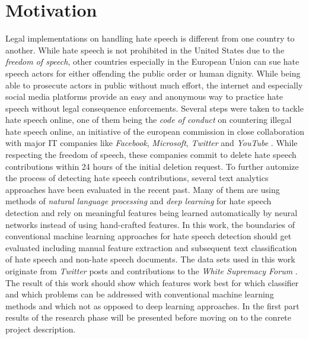 \section{Motivation}

Legal implementations on handling hate speech is different from one country to another. While hate speech is not prohibited in the United States due to the \textit{freedom of speech}, other countries especially in the European Union can sue hate speech actors for either offending the public order or human dignity. While being able to prosecute actors in public without much effort, the internet and especially social media platforms provide an easy and anonymous way to practice hate speech without legal consequence enforcements. Several steps were taken to tackle hate speech online, one of them being the \textit{code of conduct} on countering illegal hate speech online, an initiative of the european commission in close collaboration with major IT companies like \textit{Facebook}, \textit{Microsoft}, \textit{Twitter} and \textit{YouTube} \cite{EuropeanCommission.20200622}. While respecting the freedom of speech, these companies commit to delete hate speech contributions within 24 hours of the initial deletion request. To further automize the process of detecting hate speech contributions, several text analytics approaches have been evaluated in the recent past. Many of them are using methods of \textit{natural language processing} and \textit{deep learning} for hate speech detection and rely on meaningful features being learned automatically by neural networks instead of using hand-crafted features. In this work, the boundaries of conventional machine learning approaches for hate speech detection should get evaluated including manual feature extraction and subsequent text classification of hate speech and non-hate speech documents. The data sets used in this work originate from \textit{Twitter} posts \cite{ThomasDavidson.2020} and contributions to the \textit{White Supremacy Forum} \cite{OnadeGibert.2020}. The result of this work should show which features work best for which classifier and which problems can be addressed with conventional machine learning methods and which not as opposed to deep learning approaches. In the first part results of the research phase will be presented before moving on to the conrete project description. 

